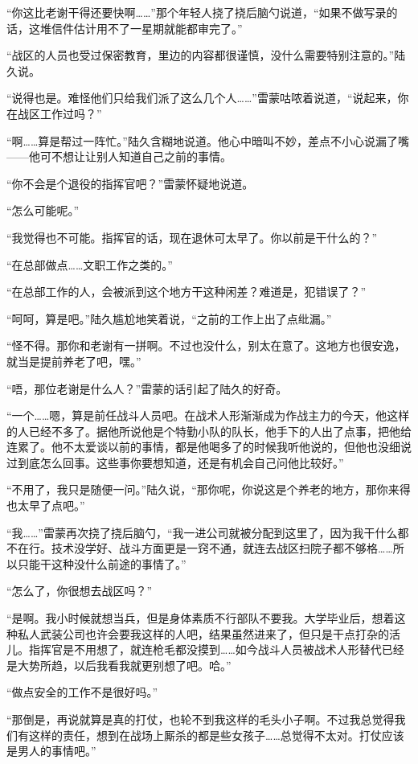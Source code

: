 “你这比老谢干得还要快啊……”那个年轻人挠了挠后脑勺说道，“如果不做写录的话，这堆信件估计用不了一星期就能都审完了。”

“战区的人员也受过保密教育，里边的内容都很谨慎，没什么需要特别注意的。”陆久说。

“说得也是。难怪他们只给我们派了这么几个人……”雷蒙咕哝着说道，“说起来，你在战区工作过吗？”

“啊……算是帮过一阵忙。”陆久含糊地说道。他心中暗叫不妙，差点不小心说漏了嘴——他可不想让让别人知道自己之前的事情。

“你不会是个退役的指挥官吧？”雷蒙怀疑地说道。

“怎么可能呢。”

“我觉得也不可能。指挥官的话，现在退休可太早了。你以前是干什么的？”

“在总部做点……文职工作之类的。”

“在总部工作的人，会被派到这个地方干这种闲差？难道是，犯错误了？”

“呵呵，算是吧。”陆久尴尬地笑着说，“之前的工作上出了点纰漏。”

“怪不得。那你和老谢有一拼啊。不过也没什么，别太在意了。这地方也很安逸，就当是提前养老了吧，嘿。”

“唔，那位老谢是什么人？”雷蒙的话引起了陆久的好奇。

“一个……嗯，算是前任战斗人员吧。在战术人形渐渐成为作战主力的今天，他这样的人已经不多了。据他所说他是个特勤小队的队长，他手下的人出了点事，把他给连累了。他不太爱谈以前的事情，都是他喝多了的时候我听他说的，但他也没细说过到底怎么回事。这些事你要想知道，还是有机会自己问他比较好。”

“不用了，我只是随便一问。”陆久说，“那你呢，你说这是个养老的地方，那你来得也太早了点吧。”

“我……”雷蒙再次挠了挠后脑勺，“我一进公司就被分配到这里了，因为我干什么都不在行。技术没学好、战斗方面更是一窍不通，就连去战区扫院子都不够格……所以只能干这种没什么前途的事情了。”

“怎么了，你很想去战区吗？”

“是啊。我小时候就想当兵，但是身体素质不行部队不要我。大学毕业后，想着这种私人武装公司也许会要我这样的人吧，结果虽然进来了，但只是干点打杂的活儿。指挥官是不用想了，就连枪毛都没摸到……如今战斗人员被战术人形替代已经是大势所趋，以后我看我就更别想了吧。哈。”

“做点安全的工作不是很好吗。”

“那倒是，再说就算是真的打仗，也轮不到我这样的毛头小子啊。不过我总觉得我们有这样的责任，想到在战场上厮杀的都是些女孩子……总觉得不太对。打仗应该是男人的事情吧。”

